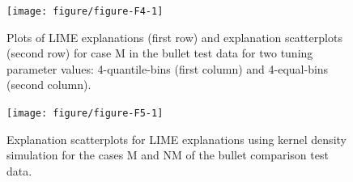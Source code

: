 \documentclass[AMS,STIX2COL]{WileyNJD-v2}\usepackage[]{graphicx}\usepackage[]{color}
\newenvironment{knitrout}{}{} %
\renewcommand{\sout}[1]{\unskip}
\begin{document}
\begin{figure}[!t]
\begin{knitrout}
\color{fgcolor}

{\centering \texttt{[image: figure/figure-F4-1]} 

}



\end{knitrout}
\caption{Plots of LIME explanations (first row) and explanation scatterplots (second row) for case M in the bullet test data for two tuning parameter values: 4-quantile-bins (first column) and 4-equal-bins (second column).\sout{ The plots provide insights into the LIME explanations and allow for the assessment of the explanation quality.}}
\label{fig:figure-F4}
\end{figure}

\begin{figure}[!thp]
\begin{knitrout}
\color{fgcolor}

{\centering \texttt{[image: figure/figure-F5-1]} 

}



\end{knitrout}
\caption{Explanation scatterplots for LIME explanations using kernel density simulation for the cases M and NM of the bullet comparison test data.}
\label{fig:figure-F5}
\end{figure}
\end{document}
